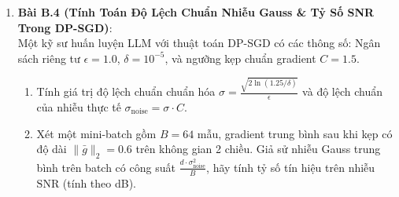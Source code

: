 \begin{enumerate}
  \item \textbf{Bài B.4 (Tính Toán Độ Lệch Chuẩn Nhiễu Gauss \& Tỷ Số SNR Trong DP-SGD)}: \\
  Một kỹ sư huấn luyện LLM với thuật toán DP-SGD có các thông số: Ngân sách riêng tư $\epsilon = 1.0$, $\delta = 10^{-5}$, và ngưỡng kẹp chuẩn gradient $C = 1.5$.
  \begin{enumerate}
    \item Tính giá trị độ lệch chuẩn chuẩn hóa $\sigma = \frac{\sqrt{2 \ln(1.25/\delta)}}{\epsilon}$ và độ lệch chuẩn của nhiễu thực tế $\sigma_{\text{noise}} = \sigma \cdot C$.
    \item Xét một mini-batch gồm $B = 64$ mẫu, gradient trung bình sau khi kẹp có độ dài $\|\bar{g}\|_2 = 0.6$ trên không gian 2 chiều. Giả sử nhiễu Gauss trung bình trên batch có công suất $\frac{d \cdot \sigma_{\text{noise}}^2}{B}$, hãy tính tỷ số tín hiệu trên nhiễu $\text{SNR}$ (tính theo dB).
  \end{enumerate}
\end{enumerate}


